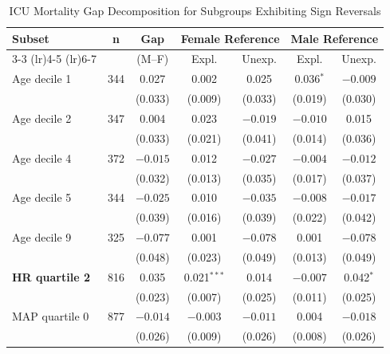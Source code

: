 \begin{table}[H]
    \centering
    \caption{ICU Mortality Gap Decomposition for Subgroups Exhibiting Sign Reversals}
    \label{tab:icu_mortality}
    \scriptsize
    \begin{tabular}{@{}lc*{5}{c}@{}}
    \toprule
    \multirow{2}{*}{\textbf{Subset}} &
    \multirow{2}{*}{\textbf{n}} &
    \textbf{Gap} &
    \multicolumn{2}{c}{\textbf{Female Reference}} &
    \multicolumn{2}{c}{\textbf{Male Reference}} \\
    \cmidrule(lr){3-3} \cmidrule(lr){4-5} \cmidrule(lr){6-7}
    & & (M–F) & Expl. & Unexp. & Expl. & Unexp. \\
    \midrule
    
    Age decile 1 & 344 & 0.027 & 0.002 & 0.025 & 0.036$^{*}$ & $-0.009$ \\
    & & (0.033) & (0.009) & (0.033) & (0.019) & (0.030) \\[0.3em]
    
    Age decile 2 & 347 & 0.004 & 0.023 & $-0.019$ & $-0.010$ & 0.015 \\
    & & (0.033) & (0.021) & (0.041) & (0.014) & (0.036) \\[0.3em]
    
    Age decile 4 & 372 & $-0.015$ & 0.012 & $-0.027$ & $-0.004$ & $-0.012$ \\
    & & (0.032) & (0.013) & (0.035) & (0.017) & (0.037) \\[0.3em]
    
    Age decile 5 & 344 & $-0.025$ & 0.010 & $-0.035$ & $-0.008$ & $-0.017$ \\
    & & (0.039) & (0.016) & (0.039) & (0.022) & (0.042) \\[0.3em]
    
    Age decile 9 & 325 & $-0.077$ & 0.001 & $-0.078$ & 0.001 & $-0.078$ \\
    & & (0.048) & (0.023) & (0.049) & (0.013) & (0.049) \\[0.3em]
    
    \textbf{HR quartile 2} & 816 & 0.035 & 0.021$^{***}$ & 0.014 & $-0.007$ & 0.042$^{*}$ \\
    & & (0.023) & (0.007) & (0.025) & (0.011) & (0.025) \\[0.3em]
    
    MAP quartile 0 & 877 & $-0.014$ & $-0.003$ & $-0.011$ & 0.004 & $-0.018$ \\
    & & (0.026) & (0.009) & (0.026) & (0.008) & (0.026) \\[0.3em]
    

\end{tabular}
\end{table}
